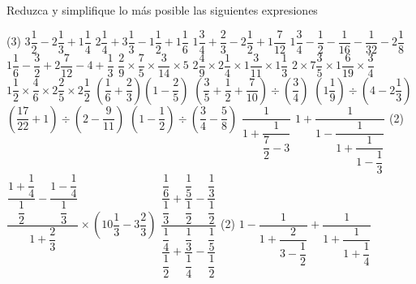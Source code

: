 \documentclass{sn-guia}
\begin{document}
%
\begin{tcolorbox}[boxrule=1pt,colback=white,leftrule=3mm,enlarge top by=3mm,enlarge bottom by=5mm]
    \raggedright Reduzca y simplifique lo más posible las siguientes expresiones     
\end{tcolorbox}
\begin{ejercicios}[label-offset=1cm,item-indent=1.8cm](3)
    \task $3\dfrac{1}{2} - 2\dfrac{1}{3} + 1\dfrac{1}{4}$
    \task $2\dfrac{1}{4} + 3\dfrac{1}{3} -1\dfrac{1}{2} + 1\dfrac{1}{6}$
    \task $1\dfrac{3}{4} + \dfrac{2}{3} - 2\dfrac{1}{2} + 1\dfrac{7}{12}$
    \task $1\dfrac{3}{4} - \dfrac{1}{2} - \dfrac{1}{16} - \dfrac{1}{32} - 2\dfrac{1}{8}$
    \task $1\dfrac{1}{6} - \dfrac{3}{2} + 2\dfrac{7}{12} -4 + \dfrac{1}{3}$
    \task $\dfrac{2}{9}\times\dfrac{7}{5}\times\dfrac{3}{14}\times 5$
    \task $2\dfrac{4}{9}\times 2\dfrac{1}{4} \times 1\dfrac{3}{11} \times 1\dfrac{1}{3}$
    \task $2\times 7\dfrac{3}{5} \times 1\dfrac{6}{19} \times \dfrac{3}{4}$
    \task $1\dfrac{1}{2} \times \dfrac{4}{6} \times 2\dfrac{2}{5} \times 2\dfrac{1}{2}$
    \task $\left(\dfrac{1}{6}+\dfrac{2}{3}\right)\left(1-\dfrac{2}{5}\right)$
    \task $\left(\dfrac{3}{5}+ \dfrac{1}{2} +\dfrac{7}{10}\right)\div\left(\dfrac{3}{4}\right)$
    \task $\left(1\dfrac{1}{9}\right)\div\left(4-2\dfrac{1}{3}\right)$
    \task $\left(\dfrac{17}{22}+1\right)\div\left(2-\dfrac{9}{11}\right)$
    \task $\left(1-\dfrac{1}{2}\right)\div\left(\dfrac{3}{4}-\dfrac{5}{8}\right)$
    \task $\dfrac{1}{1 + \dfrac{1}{\dfrac{7}{2}-3}}$
    \task $1 + \dfrac{1}{1-\dfrac{1}{1+\dfrac{1}{1-\dfrac{1}{3}}}}$
    \task*(2) $\dfrac{\dfrac{1+\dfrac{1}{4}}{\dfrac{1}{2}} - \dfrac{1-\dfrac{1}{4}}{\dfrac{1}{3}}}{1+\dfrac{2}{3}}\times\left(10\dfrac{1}{3}-3\dfrac{2}{3}\right)$
    \task $\dfrac{\dfrac{\dfrac{1}{6}}{\dfrac{1}{3}}+\dfrac{\dfrac{1}{5}}{\dfrac{1}{2}}-\dfrac{\dfrac{1}{3}}{\dfrac{1}{2}}}%
    {\dfrac{\dfrac{1}{4}}{\dfrac{1}{2}} + \dfrac{\dfrac{1}{3}}{\dfrac{1}{4}} - \dfrac{\dfrac{1}{5}}{\dfrac{1}{2}}}$
    \task*(2) $1-\dfrac{1}{1+\dfrac{2}{3-\dfrac{1}{2}}} + \dfrac{1}{1+\dfrac{1}{1+\dfrac{1}{4}}}$ 
\end{ejercicios}
\end{document}
